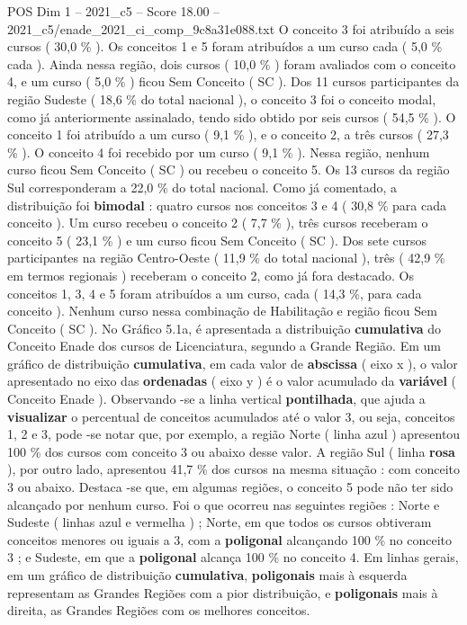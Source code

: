 \begin{textsample}{POS Dim 1 – 2021\_c5 – Score 18.00 – 2021\_c5/enade\_2021\_ci\_comp\_9c8a31e088.txt}
O conceito 3 foi atribuído a seis cursos ( 30,0 \% ).
Os conceitos 1 e 5 foram atribuídos a um curso cada ( 5,0 \% cada ).
Ainda nessa região, dois cursos ( 10,0 \% ) foram avaliados com o conceito 4, e um curso ( 5,0 \% ) ficou Sem Conceito ( SC ).
Dos 11 cursos participantes da região Sudeste ( 18,6 \% do total nacional ), o conceito 3 foi o conceito modal, como já anteriormente assinalado, tendo sido obtido por seis cursos ( 54,5 \% ).
O conceito 1 foi atribuído a um curso ( 9,1 \% ), e o conceito 2, a três cursos ( 27,3 \% ).
O conceito 4 foi recebido por um curso ( 9,1 \% ).
Nessa região, nenhum curso ficou Sem Conceito ( SC ) ou recebeu o conceito 5.
Os 13 cursos da região Sul corresponderam a 22,0 \% do total nacional.
Como já comentado, a distribuição foi \textbf{bimodal} : quatro cursos nos conceitos 3 e 4 ( 30,8 \% para cada conceito ).
Um curso recebeu o conceito 2 ( 7,7 \% ), três cursos receberam o conceito 5 ( 23,1 \% ) e um curso ficou Sem Conceito ( SC ).
Dos sete cursos participantes na região Centro-Oeste ( 11,9 \% do total nacional ), três ( 42,9 \% em termos regionais ) receberam o conceito 2, como já fora destacado.
Os conceitos 1, 3, 4 e 5 foram atribuídos a um curso, cada ( 14,3 \%, para cada conceito ).
Nenhum curso nessa combinação de Habilitação e região ficou Sem Conceito ( SC ).
No Gráfico 5.1a, é apresentada a distribuição \textbf{cumulativa} do Conceito Enade dos cursos de Licenciatura, segundo a Grande Região.
Em um gráfico de distribuição \textbf{cumulativa}, em cada valor de \textbf{abscissa} ( eixo x ), o valor apresentado no eixo das \textbf{ordenadas} ( eixo y ) é o valor acumulado da \textbf{variável} ( Conceito Enade ).
Observando -se a linha vertical \textbf{pontilhada}, que ajuda a \textbf{visualizar} o percentual de conceitos acumulados até o valor 3, ou seja, conceitos 1, 2 e 3, pode -se notar que, por exemplo, a região Norte ( linha azul ) apresentou 100 \% dos cursos com conceito 3 ou abaixo desse valor.
A região Sul ( linha \textbf{rosa} ), por outro lado, apresentou 41,7 \% dos cursos na mesma situação : com conceito 3 ou abaixo.
Destaca -se que, em algumas regiões, o conceito 5 pode não ter sido alcançado por nenhum curso.
Foi o que ocorreu nas seguintes regiões : Norte e Sudeste ( linhas azul e vermelha ) ; Norte, em que todos os cursos obtiveram conceitos menores ou iguais a 3, com a \textbf{poligonal} alcançando 100 \% no conceito 3 ; e Sudeste, em que a \textbf{poligonal} alcança 100 \% no conceito 4.
Em linhas gerais, em um gráfico de distribuição \textbf{cumulativa}, \textbf{poligonais} mais à esquerda representam as Grandes Regiões com a pior distribuição, e \textbf{poligonais} mais à direita, as Grandes Regiões com os melhores conceitos.

\end{textsample}
